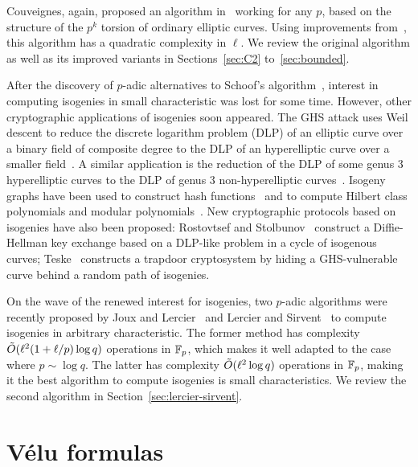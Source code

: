 Couveignes, again, proposed an algorithm in~\cite{couveignes96}
working for any $p$, based on the structure of the $p^k$ torsion of
ordinary elliptic curves. Using improvements
from~\cite{couveignes00,df+schost09,df10}, this algorithm has a
quadratic complexity in $\ell$. We review the original algorithm as
well as its improved variants in Sections~\ref{sec:C2}
to~\ref{sec:bounded}.

After the discovery of $p$-adic alternatives to Schoof's
algorithm~\cite{satoh00,fouquet+gaudry+harley00}, interest in computing
isogenies in small characteristic was lost for some time. However,
other cryptographic applications of isogenies soon appeared.  The
GHS attack uses Weil descent to reduce the
discrete logarithm problem
(DLP) of an elliptic curve
over a binary field of composite degree to the DLP of an hyperelliptic
curve over a smaller field~\cite{gaudry+hess+smart02,GHS,hess03}. A
similar application is the reduction of the DLP of some genus $3$
hyperelliptic curves to the DLP of genus $3$ non-hyperelliptic
curves~\cite{smith09}. Isogeny graphs have been used to construct hash
functions~\cite{charles+lauter+goren09} and to compute Hilbert class
polynomials and modular
polynomials~\cite{sutherland10:hilbert,sutherland10:modpol}. New
cryptographic protocols based on isogenies have also been proposed:
Rostovtsef and Stolbunov~\cite{rostovtsev+stolbunov06} construct a
Diffie-Hellman key exchange based on a DLP-like problem in a cycle of
isogenous curves; Teske~\cite{mauer+menezes+teske01,teske06}
constructs a trapdoor cryptosystem by hiding a GHS-vulnerable curve
behind a random path of isogenies.

On the wave of the renewed interest for isogenies, two $p$-adic
algorithms were recently proposed by Joux and
Lercier~\cite{joux+lercier06} and Lercier and
Sirvent~\cite{lercier+sirvent08} to compute isogenies in arbitrary
characteristic. The former method has complexity $\tilde{O}(\ell^2(1 +
\ell/p)\log q)$ operations in $\mathbb{F}_p$, which makes it well adapted to
the case where $p\sim\log q$.  The latter has complexity
$\tilde{O}(\ell^2\log q)$ operations in $\mathbb{F}_p$, making it the best
algorithm to compute isogenies is small characteristics. We review the
second algorithm in Section~\ref{sec:lercier-sirvent}.


\section{Vélu formulas}
\label{sec:velu-formulas}


